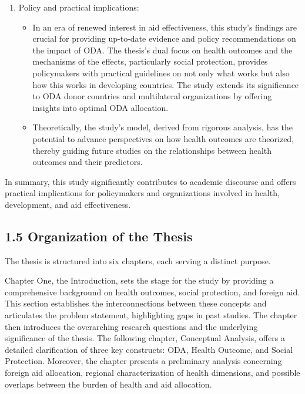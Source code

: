 \begin{enumerate}[i]
    \item Policy and practical implications: 
    \begin{itemize}
        \item In an era of renewed interest in aid effectiveness, this study’s findings are crucial for providing up-to-date evidence and policy recommendations on the impact of ODA. The thesis's dual focus on health outcomes and the mechanisms of the effects, particularly social protection, provides policymakers with practical guidelines on not only what works but also how this works in developing countries. The study extends its significance to ODA donor countries and multilateral organizations by offering insights into optimal ODA allocation. 
        \item Theoretically, the study’s model, derived from rigorous analysis, has the potential to advance perspectives on how health outcomes are theorized, thereby guiding future studies on the relationships between health outcomes and their predictors.
    \end{itemize}
\end{enumerate}
In summary, this study significantly contributes to academic discourse and offers practical implications for policymakers and organizations involved in health, development, and aid effectiveness.


\subsection*{1.5 Organization of the Thesis}

The thesis is structured into six chapters, each serving a distinct purpose.

Chapter One, the Introduction, sets the stage for the study by providing a comprehensive background on health outcomes, social protection, and foreign aid. This section establishes the interconnections between these concepts and articulates the problem statement, highlighting gaps in past studies. The chapter then introduces the overarching research questions and the underlying significance of the thesis. The following chapter, Conceptual Analysis, offers a detailed clarification of three key constructs: ODA, Health Outcome, and Social Protection. Moreover, the chapter presents a preliminary analysis concerning foreign aid allocation, regional characterization of health dimensions, and possible overlaps between the burden of health and aid allocation.

